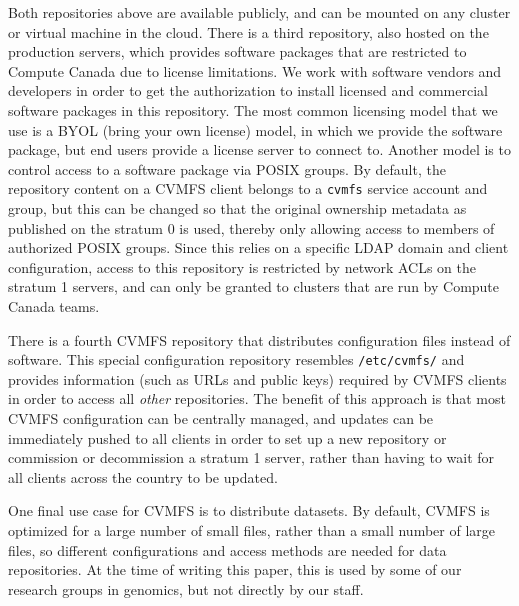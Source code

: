 \documentclass[sigconf]{acmart}
\begin{document}
Both repositories above are available publicly, and can be mounted on any cluster or virtual machine in the cloud. There is a third repository, also hosted on the production servers, which provides software packages that are restricted to Compute Canada due to license limitations. We work with software vendors and developers in order to get the authorization to install licensed and commercial software packages in this repository. The most common licensing model that we use is a BYOL (bring your own license) model, in which we provide the software package, but end users provide a license server to connect to. Another model is to control access to a software package via POSIX groups. By default, the repository content on a CVMFS client belongs to a \texttt{cvmfs} service account and group, but this can be changed so that the original ownership metadata as published on the stratum 0 is used, thereby only allowing access to members of authorized POSIX groups. Since this relies on a specific LDAP domain and client configuration, access to this repository is restricted by network ACLs on the stratum 1 servers, and can only be granted to clusters that are run by Compute Canada teams. 

There is a fourth CVMFS repository that distributes configuration files instead of software. This special configuration repository resembles \texttt{/etc/cvmfs/} and provides information (such as URLs and public keys) required by CVMFS clients in order to access all {\it other} repositories. The benefit of this approach is that most CVMFS configuration can be centrally managed, and updates can be immediately pushed to all clients in order to set up a new repository or commission or decommission a stratum 1 server, rather than having to wait for all clients across the country to be updated.

One final use case for CVMFS is to distribute datasets. By default, CVMFS  is optimized for a large number of small files, rather than a small number of large files, so different  configurations and access methods are needed for data repositories. At the time of writing this paper, this is used by some of our research groups in genomics, but not directly by our staff. 
\end{document}
